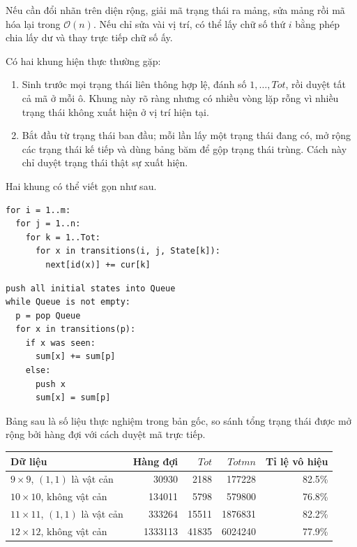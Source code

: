 \documentclass[11pt]{article}
\newcommand{\Oh}{\mathcal{O}}
\begin{document}
Nếu cần đổi nhãn trên diện rộng, giải mã trạng thái ra mảng, sửa mảng rồi mã
hóa lại trong \(\Oh(n)\). Nếu chỉ sửa vài vị trí, có thể lấy chữ số thứ \(i\)
bằng phép chia lấy dư và thay trực tiếp chữ số ấy.

Có hai khung hiện thực thường gặp:
\begin{enumerate}
  \item {} Sinh trước mọi trạng thái
  liên thông hợp lệ, đánh số \(1,\ldots,Tot\), rồi duyệt tất cả mã ở mỗi ô.
  Khung này rõ ràng nhưng có nhiều vòng lặp rỗng vì nhiều trạng thái không
  xuất hiện ở vị trí hiện tại.
  \item {} Bắt đầu từ trạng thái ban đầu;
  mỗi lần lấy một trạng thái đang có, mở rộng các trạng thái kế tiếp và dùng
  bảng băm để gộp trạng thái trùng. Cách này chỉ duyệt trạng thái thật sự xuất
  hiện.
\end{enumerate}

Hai khung có thể viết gọn như sau.
\begin{verbatim}
for i = 1..m:
  for j = 1..n:
    for k = 1..Tot:
      for x in transitions(i, j, State[k]):
        next[id(x)] += cur[k]
\end{verbatim}
\begin{verbatim}
push all initial states into Queue
while Queue is not empty:
  p = pop Queue
  for x in transitions(p):
    if x was seen:
      sum[x] += sum[p]
    else:
      push x
      sum[x] = sum[p]
\end{verbatim}

Bảng sau là số liệu thực nghiệm trong bản gốc, so sánh tổng trạng thái được mở
rộng bởi hàng đợi với cách duyệt mã trực tiếp.

\begin{center}
\small
\begin{tabular}{lrrrr}
\hline
Dữ liệu & Hàng đợi & \(Tot\) & \(Totmn\) & Tỉ lệ vô hiệu \\
\hline
\(9\times9\), \((1,1)\) là vật cản & 30930 & 2188 & 177228 & 82.5\% \\
\(10\times10\), không vật cản & 134011 & 5798 & 579800 & 76.8\% \\
\(11\times11\), \((1,1)\) là vật cản & 333264 & 15511 & 1876831 & 82.2\% \\
\(12\times12\), không vật cản & 1333113 & 41835 & 6024240 & 77.9\% \\
\hline
\end{tabular}
\end{center}
\end{document}
